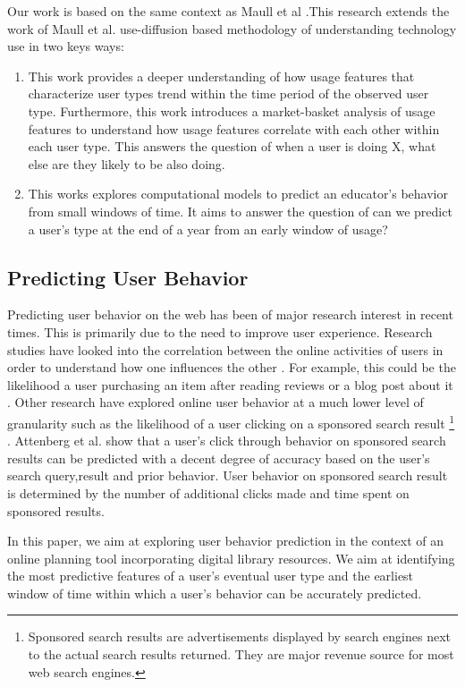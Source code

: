 \documentclass{acm_proc_article-sp}
\begin{document}
Our work is based on the same context as Maull et al \cite{maullunderstanding} .This research extends the work of Maull et al. \cite{maullunderstanding} use-diffusion based methodology of understanding technology use in two keys ways: 
\begin{enumerate}
\item This work provides a deeper understanding of how usage features that characterize user types trend within the time period of the observed user type. Furthermore, this work introduces a market-basket analysis of usage features to understand how usage features correlate with each other within each user type. This answers the question of when a user is doing X, what else are they likely to be also doing.

\item This works explores computational models to predict an educator's behavior from small windows of time. It aims to answer the question of can we predict a user's type at the end of a year from an early window of usage?
\end{enumerate}

\subsection{Predicting User Behavior}
Predicting user behavior on the web has been of major research interest in recent times. This is primarily due to the need to improve user experience.  Research studies have looked into the correlation between  the online activities of users in order to understand how one influences the other \cite{adar2007we}. For example, this could be the likelihood a user purchasing an item after reading reviews or a blog post about it \cite{adar2007we}. Other research have explored online user behavior at a much lower level of granularity such as the likelihood of a user clicking on a sponsored search result \footnote{Sponsored search results are advertisements displayed by search engines next to the actual search results returned. They are major revenue source for most web search engines.} \cite{Attenberg:2009}. Attenberg et al. \cite{Attenberg:2009} show that a user's click through behavior on sponsored search results can be predicted with a decent degree of accuracy based on the user's search query,result and prior behavior. User behavior on sponsored search result is determined by the number of additional clicks made and time spent on sponsored results.

In this paper, we aim at exploring user behavior prediction in the context of an online planning tool incorporating digital library resources. We aim at identifying the most predictive features of a user's eventual user type and the earliest window of time within which a user's behavior can be accurately predicted.
\end{document}
